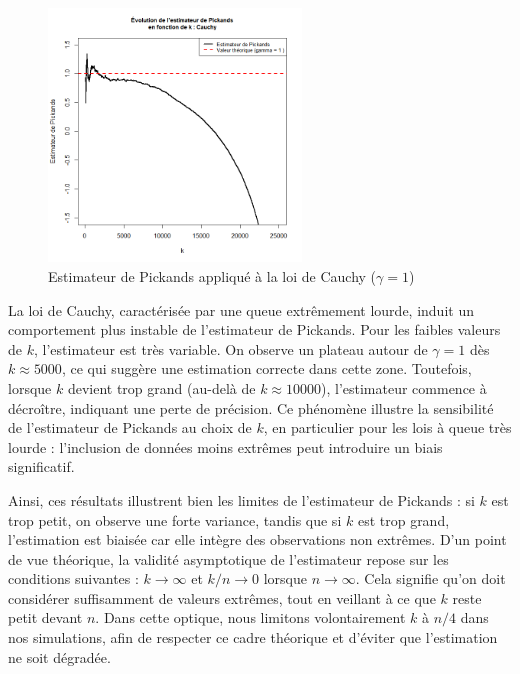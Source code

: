 \documentclass{article}
\theoremstyle{plain}
\theoremstyle{definition}
\theoremstyle{plain}
\begin{document}
\begin{figure}[H]
    \centering
    \includegraphics[width=0.6\textwidth]{./Evolution des estimateurs/pickands/estimateur_pickands_cauchy.png}
    \caption{Estimateur de Pickands appliqué à la loi de Cauchy ($\gamma = 1$)}
\end{figure}
\noindent La loi de Cauchy, caractérisée par une queue extrêmement lourde, induit un comportement plus instable de l’estimateur de Pickands. Pour les faibles valeurs de \(k\), l’estimateur est très variable. On observe un plateau autour de \(\gamma = 1\) dès \(k \approx 5000\), ce qui suggère une estimation correcte dans cette zone. Toutefois, lorsque \(k\) devient trop grand (au-delà de \(k \approx 10000\)), l’estimateur commence à décroître, indiquant une perte de précision. Ce phénomène illustre la sensibilité de l’estimateur de Pickands au choix de \(k\), en particulier pour les lois à queue très lourde : l’inclusion de données moins extrêmes peut introduire un biais significatif.

\vspace{0.5cm}

\noindent Ainsi, ces résultats illustrent bien les limites de l’estimateur de Pickands : si \(k\) est trop petit, on observe une forte variance, tandis que si \(k\) est trop grand, l’estimation est biaisée car elle intègre des observations non extrêmes. D’un point de vue théorique, la validité asymptotique de l’estimateur repose sur les conditions suivantes : \(k \to \infty\) et \(k/n \to 0\) lorsque \(n \to \infty\). Cela signifie qu’on doit considérer suffisamment de valeurs extrêmes, tout en veillant à ce que \(k\) reste petit devant \(n\). Dans cette optique, nous limitons volontairement \(k\) à \(n/4\) dans nos simulations, afin de respecter ce cadre théorique et d’éviter que l’estimation ne soit dégradée.
\end{document}
